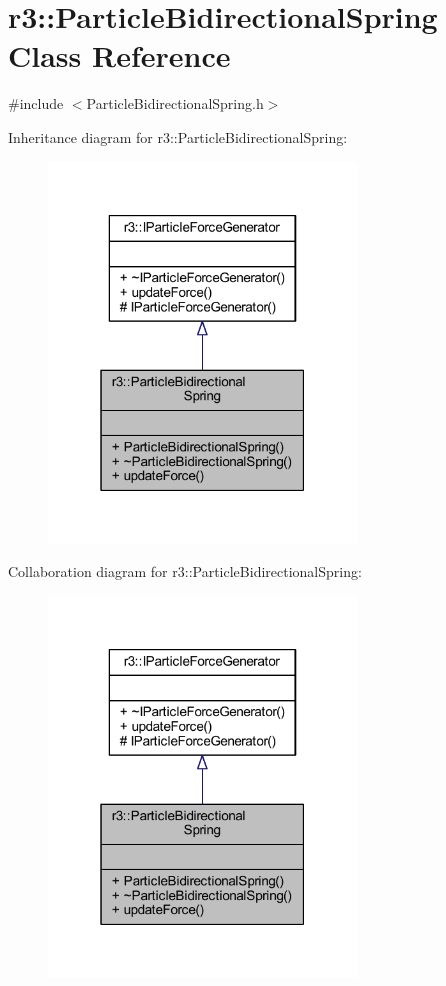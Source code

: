 \hypertarget{classr3_1_1_particle_bidirectional_spring}{}\section{r3\+:\+:Particle\+Bidirectional\+Spring Class Reference}
\label{classr3_1_1_particle_bidirectional_spring}


{\ttfamily \#include $<$Particle\+Bidirectional\+Spring.\+h$>$}



Inheritance diagram for r3\+:\+:Particle\+Bidirectional\+Spring\+:\nopagebreak
\begin{figure}[H]
\begin{center}
\leavevmode
\includegraphics[width=232pt]{classr3_1_1_particle_bidirectional_spring__inherit__graph}
\end{center}
\end{figure}


Collaboration diagram for r3\+:\+:Particle\+Bidirectional\+Spring\+:\nopagebreak
\begin{figure}[H]
\begin{center}
\leavevmode
\includegraphics[width=232pt]{classr3_1_1_particle_bidirectional_spring__coll__graph}
\end{center}
\end{figure}
